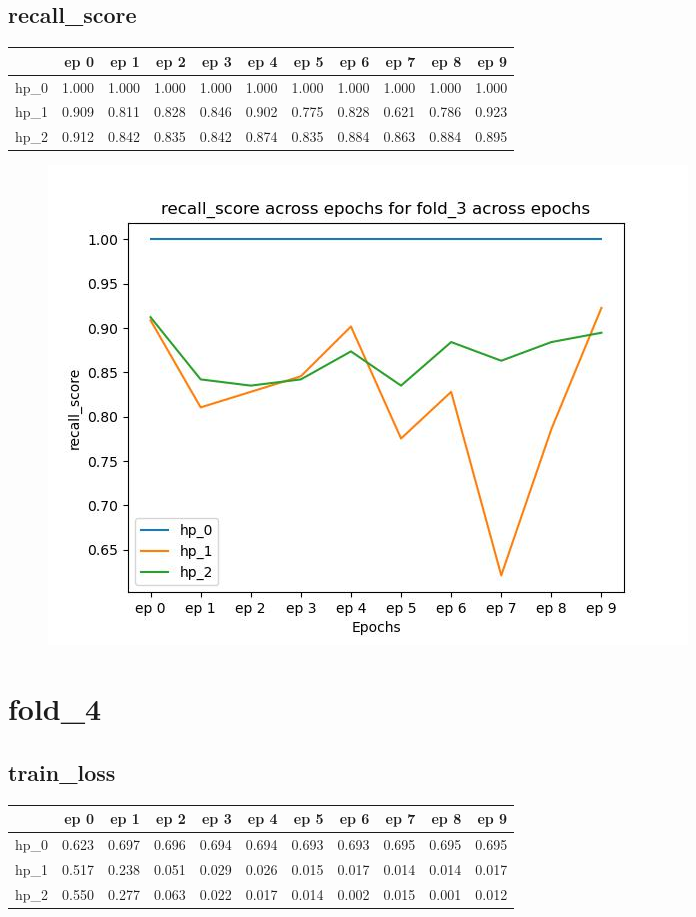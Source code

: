 \documentclass{article}
\begin{document}
\subsection{recall\_score}
\begin{tabular}{lrrrrrrrrrr}
\toprule
{} &   ep 0 &   ep 1 &   ep 2 &   ep 3 &   ep 4 &   ep 5 &   ep 6 &   ep 7 &   ep 8 &   ep 9 \\
\midrule
hp\_0 &  1.000 &  1.000 &  1.000 &  1.000 &  1.000 &  1.000 &  1.000 &  1.000 &  1.000 &  1.000 \\
hp\_1 &  0.909 &  0.811 &  0.828 &  0.846 &  0.902 &  0.775 &  0.828 &  0.621 &  0.786 &  0.923 \\
hp\_2 &  0.912 &  0.842 &  0.835 &  0.842 &  0.874 &  0.835 &  0.884 &  0.863 &  0.884 &  0.895 \\
\bottomrule
\end{tabular}

\begin{figure}[H]
\includegraphics[scale = 0.75]{fold_3/recall_score}
\end{figure}
\section{fold\_4}
\subsection{train\_loss}
\begin{tabular}{lrrrrrrrrrr}
\toprule
{} &   ep 0 &   ep 1 &   ep 2 &   ep 3 &   ep 4 &   ep 5 &   ep 6 &   ep 7 &   ep 8 &   ep 9 \\
\midrule
hp\_0 &  0.623 &  0.697 &  0.696 &  0.694 &  0.694 &  0.693 &  0.693 &  0.695 &  0.695 &  0.695 \\
hp\_1 &  0.517 &  0.238 &  0.051 &  0.029 &  0.026 &  0.015 &  0.017 &  0.014 &  0.014 &  0.017 \\
hp\_2 &  0.550 &  0.277 &  0.063 &  0.022 &  0.017 &  0.014 &  0.002 &  0.015 &  0.001 &  0.012 \\
\bottomrule
\end{tabular}
\end{document}
